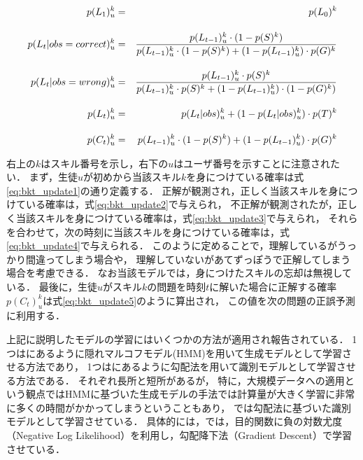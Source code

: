 \hspace*{-55pt}
\begin{eqnarray}
\label{eq:bkt_update1}
p(L_1)^{k}_{u} &=& p(L_0)^k \\[\eqnsp]
\label{eq:bkt_update2}
p(L_{t}|obs=correct)^{k}_{u} &=& \frac{ p(L_{t-1})^{k}_{u} \cdot (1 - p(S)^k) }{ p(L_{t-1})^{k}_{u} \cdot (1 - p(S)^k) + (1 - p(L_{t-1})^{k}_{u}) \cdot p(G)^k } \\[\eqnsp]
\label{eq:bkt_update3}
p(L_{t}|obs=wrong)^{k}_{u} &=& \frac{ p(L_{t-1})^{k}_{u} \cdot p(S)^k }{ p(L_{t-1})^{k}_{u} \cdot p(S)^k + (1 - p(L_{t-1})^{k}_{u}) \cdot (1 - p(G)^k) } \\[\eqnsp]
\label{eq:bkt_update4}
p(L_{t})^{k}_{u} &=& p(L_{t}|obs)^{k}_{u} + (1 - p(L_{t}|obs)^{k}_{u}) \cdot p(T)^k  \\[\eqnsp]
\label{eq:bkt_update5}
p(C_{t})^{k}_{u} &=& p(L_{t-1})^{k}_{u} \cdot (1 - p(S)^k) + (1 - p(L_{t-1})^k_{u}) \cdot p(G)^k
\end{eqnarray}
\endminipage\hfill
\vvspace
\vvspace


右上の$k$はスキル番号を示し，右下の$u$はユーザ番号を示すことに注意されたい．
まず，生徒$u$が初めから当該スキル$k$を身につけている確率は式\ref{eq:bkt_update1}の通り定義する．
正解が観測され，正しく当該スキルを身につけている確率は，式\ref{eq:bkt_update2}で与えられ，
不正解が観測されたが，正しく当該スキルを身につけている確率は，式\ref{eq:bkt_update3}で与えられ，
それらを合わせて，次の時刻に当該スキルを身につけている確率は，式\ref{eq:bkt_update4}で与えられる．
このように定めることで，理解しているがうっかり間違ってしまう場合や， 理解していないがあてずっぽうで正解してしまう場合を考慮できる．
なお当該モデルでは，身につけたスキルの忘却は無視している．
最後に，生徒$u$がスキル$k$の問題を時刻$t$に解いた場合に正解する確率$p(C_{t})^{k}_{u}$は式\ref{eq:bkt_update5}のように算出され，
この値を次の問題の正誤予測に利用する．
 
上記に説明したモデルの学習にはいくつかの方法が適用され報告されている．
1つは\cite{corbett1994knowledge}にあるように隠れマルコフモデル(HMM)を用いて生成モデルとして学習させる方法であり，
1つは\cite{yudelson2013individualized}にあるように勾配法を用いて識別モデルとして学習させる方法である．
それぞれ長所と短所があるが，
特に，大規模データへの適用という観点ではHMMに基づいた生成モデルの手法では計算量が大きく学習に非常に多くの時間がかかってしまうということもあり，
\cite{yudelson2013individualized}では勾配法に基づいた識別モデルとして学習させている．
具体的には，\cite{yudelson2013individualized}では，目的関数に負の対数尤度（Negative Log Likelihood）を利用し，勾配降下法（Gradient Descent）で学習させている．




